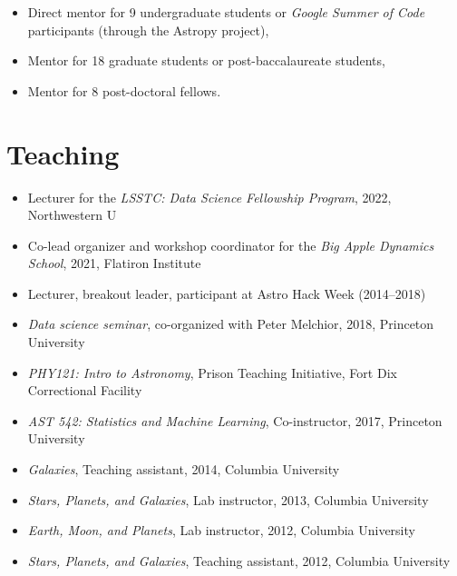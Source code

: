 \documentclass[12pt, letterpaper]{apw-cv}
\begin{document}



\begin{itemize}
    \item Direct mentor for 9 undergraduate students or \textit{Google Summer of Code} participants (through the Astropy project),
    \item Mentor for 18 graduate students or post-baccalaureate students,
    \item Mentor for 8 post-doctoral fellows.
\end{itemize}

\section*{Teaching}

\begin{itemize}
    \item Lecturer for the \textit{LSSTC: Data Science Fellowship Program}, 2022, Northwestern U
    \item Co-lead organizer and workshop coordinator for the \textit{Big Apple Dynamics School}, 2021, Flatiron Institute
    \item Lecturer, breakout leader, participant at Astro Hack Week (2014--2018)
    \item \emph{Data science seminar}, co-organized with Peter Melchior, 2018, Princeton University
    \item \emph{PHY121: Intro to Astronomy}, Prison Teaching Initiative, Fort Dix Correctional Facility
	\item \emph{AST 542: Statistics and Machine Learning}, Co-instructor, 2017, Princeton University
    \item \emph{Galaxies}, Teaching assistant, 2014, Columbia University
	\item \emph{Stars, Planets, and Galaxies}, Lab instructor, 2013, Columbia University
	\item \emph{Earth, Moon, and Planets}, Lab instructor, 2012, Columbia University
	\item \emph{Stars, Planets, and Galaxies}, Teaching assistant, 2012, Columbia University
\end{itemize}
\end{document}
